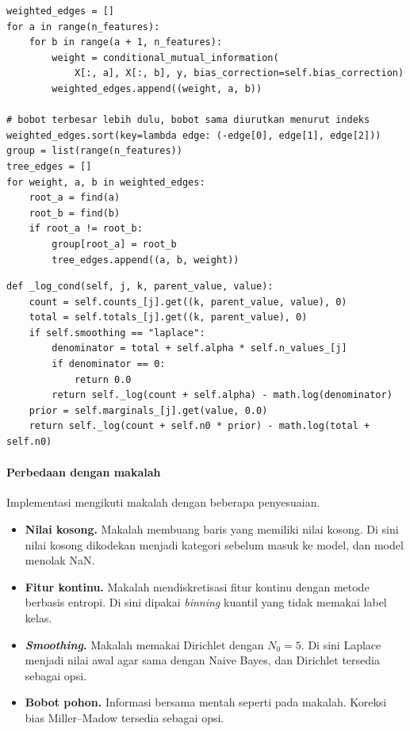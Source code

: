 \begin{lstlisting}[caption={Pembelajaran struktur pohon TAN}, label={lst:tan-struktur}]
weighted_edges = []
for a in range(n_features):
    for b in range(a + 1, n_features):
        weight = conditional_mutual_information(
            X[:, a], X[:, b], y, bias_correction=self.bias_correction)
        weighted_edges.append((weight, a, b))

# bobot terbesar lebih dulu, bobot sama diurutkan menurut indeks
weighted_edges.sort(key=lambda edge: (-edge[0], edge[1], edge[2]))
group = list(range(n_features))
tree_edges = []
for weight, a, b in weighted_edges:
    root_a = find(a)
    root_b = find(b)
    if root_a != root_b:
        group[root_a] = root_b
        tree_edges.append((a, b, weight))
\end{lstlisting}

\begin{lstlisting}[caption={Peluang fitur dengan induk fitur}, label={lst:tan-peluang}]
def _log_cond(self, j, k, parent_value, value):
    count = self.counts_[j].get((k, parent_value, value), 0)
    total = self.totals_[j].get((k, parent_value), 0)
    if self.smoothing == "laplace":
        denominator = total + self.alpha * self.n_values_[j]
        if denominator == 0:
            return 0.0
        return self._log(count + self.alpha) - math.log(denominator)
    prior = self.marginals_[j].get(value, 0.0)
    return self._log(count + self.n0 * prior) - math.log(total + self.n0)
\end{lstlisting}

\paragraph{Perbedaan dengan makalah}
Implementasi mengikuti makalah dengan beberapa penyesuaian.

\begin{itemize}
    \item \textbf{Nilai kosong.} Makalah membuang baris yang memiliki nilai kosong. Di sini nilai kosong dikodekan menjadi kategori sebelum masuk ke model, dan model menolak NaN.
    \item \textbf{Fitur kontinu.} Makalah mendiskretisasi fitur kontinu dengan metode berbasis entropi. Di sini dipakai \textit{binning} kuantil yang tidak memakai label kelas.
    \item \textbf{\textit{Smoothing}.} Makalah memakai Dirichlet dengan $N_0=5$. Di sini Laplace menjadi nilai awal agar sama dengan Naive Bayes, dan Dirichlet tersedia sebagai opsi.
    \item \textbf{Bobot pohon.} Informasi bersama mentah seperti pada makalah. Koreksi bias Miller--Madow \cite{ref:miller-1955} tersedia sebagai opsi.
\end{itemize}

